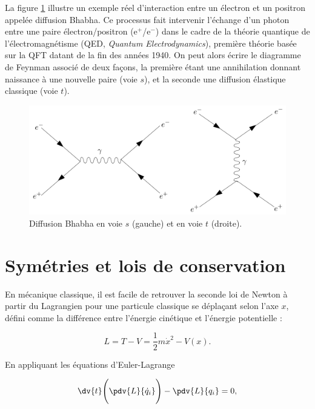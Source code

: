         La figure \ref{bhabha} illustre un exemple réel d'interaction entre un électron et un positron appelée diffusion Bhabha. Ce processus fait intervenir l'échange d'un photon entre une paire électron/positron (e$^+$/e$^-$) dans le cadre de la théorie quantique de l'électromagnétisme (QED, \textit{Quantum Electrodynamics}), première théorie basée sur la QFT datant de la fin des années 1940. On peut alors écrire le diagramme de Feynman associé de deux façons, la première étant une annihilation donnant naissance à une nouvelle paire (voie $s$), et la seconde une diffusion élastique classique (voie $t$). \\
        
        \begin{figure}
            \centering
            \includegraphics[scale=0.28]{Chapitre1/Images/bhabha.png} 
            \caption{Diffusion Bhabha en voie $s$ (gauche) et en voie $t$ (droite).}
        \label{bhabha}
        \end{figure}
        
        \section{Symétries et lois de conservation}

         En mécanique classique, il est facile de retrouver la seconde loi de Newton à partir du Lagrangien pour une particule classique se déplaçant selon l'axe $x$, défini comme la différence entre l'énergie cinétique et l'énergie potentielle :

        $$L=T-V=\frac{1}{2}m\dot{x}^2-V(x).$$

        En appliquant les équations d'Euler-Lagrange

        \begin{equation}
            \dv{t}\Biggl(\pdv{L}{\dot q_i}\Biggr)-\pdv{L}{q_i} = 0,
        \end{equation}


